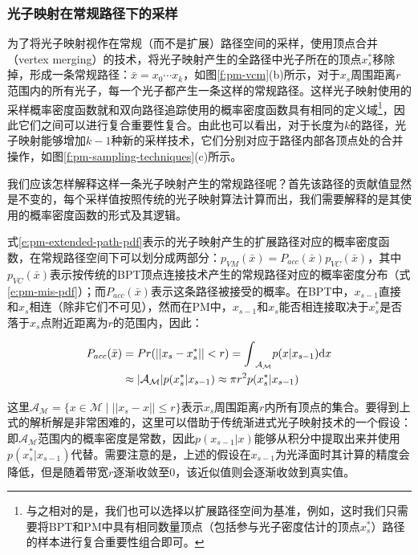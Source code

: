 \subsubsection{光子映射在常规路径下的采样}
为了将光子映射视作在常规（而不是扩展）路径空间的采样，\cite{a:LightTransportSimulationwithVertexConnectionandMerging}使用顶点合并（vertex merging）的技术，将光子映射产生的全路径中光子所在的顶点$x^{*}_s$移除掉，形成一条常规路径：$\bar{x}=x_0\cdots x_k$，如图\ref{f:pm-vcm}(b)所示，对于$x_s$周围距离$r$范围内的所有光子，每一个光子都产生一条这样的常规路径。这样光子映射使用的采样概率密度函数就和双向路径追踪使用的概率密度函数具有相同的定义域\footnote{与之相对的是，我们也可以选择以扩展路径空间为基准，例如\cite{a:APathSpaceExtensionforRobustLightTransportSimulation}，这时我们只需要将BPT和PM中具有相同数量顶点（包括参与光子密度估计的顶点$x^{*}_s$）路径的样本进行复合重要性组合即可。}，因此它们之间可以进行复合重要性复合。由此也可以看出，对于长度为$k$的路径，光子映射能够增加$k-1$种新的采样技术，它们分别对应于路径内部各顶点处的合并操作，如图\ref{f:pm-sampling-techniques}(c)所示。

我们应该怎样解释这样一条光子映射产生的常规路径呢？首先该路径的贡献值显然是不变的，每个采样值按照传统的光子映射算法计算而出，我们需要解释的是其使用的概率密度函数的形式及其逻辑。

式\ref{e:pm-extended-path-pdf}表示的光子映射产生的扩展路径对应的概率密度函数，在常规路径空间下可以划分成两部分：$p_{VM}(\bar{x})=P_{acc}(\bar{x})p_{VC}(\bar{x})$，其中$p_{VC}(\bar{x})$表示按传统的BPT顶点连接技术产生的常规路径对应的概率密度分布（式\ref{e:pm-mis-pdf}）；而$P_{acc}(\bar{x})$表示这条路径被接受的概率。在BPT中，$x_{s-1}$直接和$x_s$相连（除非它们不可见），然而在PM中，$x_{s-1}$和$x_s$能否相连接取决于$x^{*}_s$是否落于$x_s$点附近距离为$r$的范围内，因此：

\begin{equation}
\begin{aligned}
	P_{acc}(\bar{x})&=Pr(||x_s-x^{*}_s||<r)={\rm \int}_{\mathcal{A}_{\mathcal{M}}}p(x|x_{s-1}){\rm d}x\\
	&\approx |\mathcal{A}_{\mathcal{M}}|p(x^{*}_s|x_{s-1})\approx\pi r^{2}p(x^{*}_s|x_{s-1})
\end{aligned}
\end{equation}

这里$\mathcal{A}_{\mathcal{M}}=\{x\in\mathcal{M}\mid||x_s-x||\leq r \}$表示$x_s$周围距离$r$内所有顶点的集合。要得到上式的解析解是非常困难的，这里可以借助于传统渐进式光子映射技术的一个假设：即$\mathcal{A}_{\mathcal{M}}$范围内的概率密度是常数，因此$p(x_{s-1}|x)$能够从积分中提取出来并使用$p(x^{*}_s|x_{s-1})$代替。需要注意的是，上述的假设在$x_{s-1}$为光泽面时其计算的精度会降低，但是随着带宽$r$逐渐收敛至0，该近似值则会逐渐收敛到真实值。





